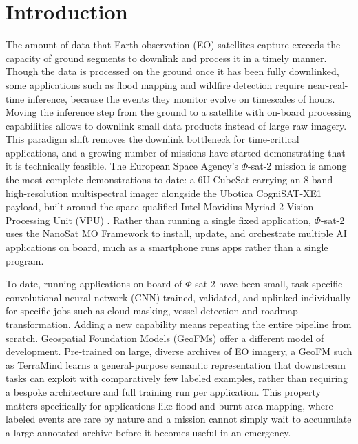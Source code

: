 \chapter{Introduction}
\label{chap:introduction}

The amount of data that Earth observation (EO) satellites capture exceeds the capacity of ground segments to downlink and process it in a timely manner\cite{barretta2026onboardaireview}.
Though the data is processed on the ground once it has been fully downlinked, some applications such as flood mapping\cite{tellman2021satellite} and wildfire detection\cite{taylor2013wildfire} require near-real-time inference, because the events they monitor evolve on timescales of hours.
Moving the inference step from the ground to a satellite with on-board processing capabilities allows to downlink small data products instead of large raw imagery.
This paradigm shift removes the downlink bottleneck for time-critical applications, and a growing number of missions have started demonstrating that it is technically feasible\cite{barretta2026onboardaireview}.
The European Space Agency's $\Phi$-sat-2 mission is among the most complete demonstrations to date: a 6U CubeSat carrying an 8-band high-resolution multispectral imager alongside the Ubotica CogniSAT-XE1 payload, built around the space-qualified Intel Movidius Myriad 2 Vision Processing Unit (VPU) \cite{myriad2}.
Rather than running a single fixed application, $\Phi$-sat-2 uses the NanoSat MO Framework\cite{coelho2021phisat2} to install, update, and orchestrate multiple AI applications on board, much as a smartphone runs apps rather than a single program.

To date, running applications on board of $\Phi$-sat-2 have been small, task-specific convolutional neural network (CNN) trained, validated, and uplinked individually for specific jobs such as cloud masking, vessel detection and roadmap transformation\cite{marin2021phi}.
Adding a new capability means repeating the entire pipeline from scratch.
Geospatial Foundation Models (GeoFMs) offer a different model of development.
Pre-trained on large, diverse archives of EO imagery, a GeoFM such as TerraMind\cite{jakubik2025terramind} learns a general-purpose semantic representation that downstream tasks can exploit with comparatively few labeled examples, rather than requiring a bespoke architecture and full training run per application.
This property matters specifically for applications like flood and burnt-area mapping, where labeled events are rare by nature and a mission cannot simply wait to accumulate a large annotated archive before it becomes useful in an emergency.

